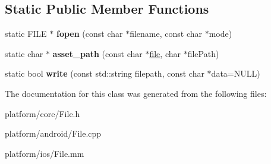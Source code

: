 \subsection*{Static Public Member Functions}
\begin{DoxyCompactItemize}
\item 
\hypertarget{class_file_ae1b5b11d63d745dc184fc27109da06fd}{static F\+I\+L\+E $\ast$ {\bfseries fopen} (const char $\ast$filename, const char $\ast$mode)}\label{class_file_ae1b5b11d63d745dc184fc27109da06fd}

\item 
\hypertarget{class_file_a9985a27bc056e01e8957e9c88f7885e4}{static char $\ast$ {\bfseries asset\+\_\+path} (const char $\ast$\hyperlink{structfile}{file}, char $\ast$file\+Path)}\label{class_file_a9985a27bc056e01e8957e9c88f7885e4}

\item 
\hypertarget{class_file_a93a6a94432f7cc829a3e30599e609575}{static bool {\bfseries write} (const std\+::string filepath, const char $\ast$data=N\+U\+L\+L)}\label{class_file_a93a6a94432f7cc829a3e30599e609575}

\end{DoxyCompactItemize}


The documentation for this class was generated from the following files\+:\begin{DoxyCompactItemize}
\item 
platform/core/File.\+h\item 
platform/android/File.\+cpp\item 
platform/ios/File.\+mm\end{DoxyCompactItemize}

